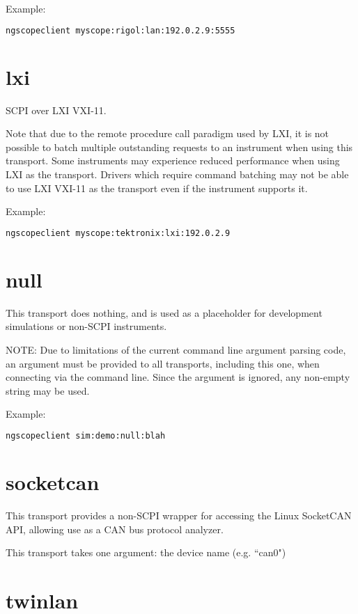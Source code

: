 Example:
\begin{lstlisting}[language=sh, numbers=none]
ngscopeclient myscope:rigol:lan:192.0.2.9:5555
\end{lstlisting}

\section{lxi}

SCPI over LXI VXI-11.

Note that due to the remote procedure call paradigm used by LXI, it is not possible to batch multiple outstanding
requests to an instrument when using this transport. Some instruments may experience reduced performance when using LXI
as the transport. Drivers which require command batching may not be able to use LXI VXI-11 as the transport even if the
instrument supports it.

Example:
\begin{lstlisting}[language=sh, numbers=none]
ngscopeclient myscope:tektronix:lxi:192.0.2.9
\end{lstlisting}

\section{null}

This transport does nothing, and is used as a placeholder for development simulations or non-SCPI instruments.

NOTE: Due to limitations of the current command line argument parsing code, an argument must be provided to all
transports, including this one, when connecting via the command line. Since the argument is ignored, any non-empty
string may be used.

Example:
\begin{lstlisting}[language=sh, numbers=none]
ngscopeclient sim:demo:null:blah
\end{lstlisting}

\section{socketcan}

This transport provides a non-SCPI wrapper for accessing the Linux SocketCAN API, allowing use as a CAN bus protocol
analyzer.

This transport takes one argument: the device name (e.g. ``can0")

\section{twinlan}

